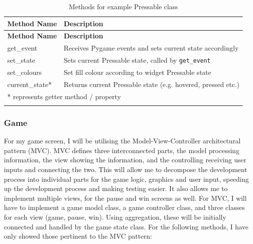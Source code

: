 \documentclass[../main/main.tex]{subfiles}
\begin{document}
\begin{longtable}[c]{l|l}
    \toprule
    \textbf{Method Name} & \textbf{Description}\\
    \midrule
    \endfirsthead
    \textbf{Method Name} & \textbf{Description}\\
    \midrule
    \endhead

    get\_event & Receives Pygame events and sets current state accordingly\\
    set\_state & Sets current Pressable state, called by \lstinline[language=Python]{get_event}\\
    set\_colours & Set fill colour according to widget Pressable state\\
    current\_state* & Returns current Pressable state (e.g. hovered, pressed etc.)\\

    \midrule

    \multicolumn{2}{l}{* represents getter method / property}\\

    \bottomrule

\caption{Methods for example Pressable class}
\label{tab:pressable-methods}
\end{longtable}

\subsubsection*{Game}
\label{sec:design-mvc}
For my game screen, I will be utilising the Model-View-Controller architectural pattern (MVC). MVC defines three interconnected parts, the model processing information, the view showing the information, and the controlling receiving user inputs and connecting the two. This will allow me to decompose the development process into individual parts for the game logic, graphics and user input, speeding up the development process and making testing easier. It also allows me to implement multiple views, for the pause and win screens as well. For MVC, I will have to implement a game model class, a game controller class, and three classes for each view (game, pause, win). Using aggregation, these will be initially connected and handled by the game state class. For the following methods, I have only showed those pertinent to the MVC pattern:
\end{document}

